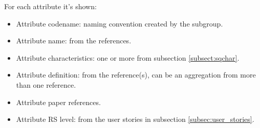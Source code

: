 For each attribute it's shown:

\begin{itemize}
    \item Attribute codename: naming convention created by the subgroup.
    \item Attribute name: from the references.
    \item Attribute characteristics: one or more from subsection \ref{subsect:sqchar}.
    \item Attribute definition: from the reference(s), can be an aggregation from more than one reference.
    \item Attribute paper references.
    \item Attribute RS level: from the user stories in subsection \ref{subsec:user_stories}.
\end{itemize}
